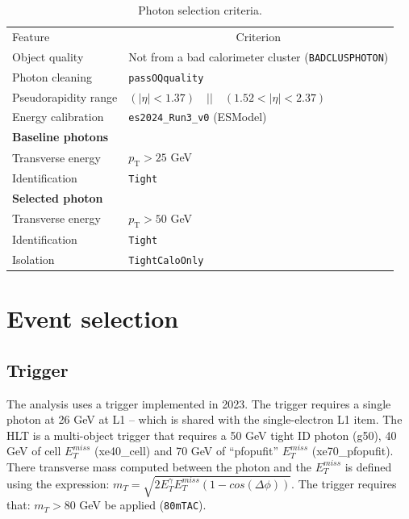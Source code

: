 \begin{table}[ht]
  \caption{Photon selection criteria.}%
  \label{tab:object:photon} 
  \centering
  \begin{tabular}{ll}
    \toprule
    Feature & \multicolumn{1}{c}{Criterion} \\
    Object quality & Not from a bad calorimeter cluster (\texttt{BADCLUSPHOTON})\\ %
    Photon cleaning & \texttt{passOQquality} \\
    Pseudorapidity range & $(|\eta| < 1.37) \quad || \quad (1.52 < |\eta| < 2.37)$ \\
    Energy calibration & \texttt{es2024\_Run3\_v0} (ESModel)\\
    \midrule\midrule
    \textbf{Baseline photons} &\\ 
    \midrule
    Transverse energy & $p_{\mathrm{T}}>25$ GeV \\
    Identification & \texttt{Tight} \\
    \midrule
    \textbf{Selected photon} &\\ 
    \midrule
    Transverse energy & $p_{\mathrm{T}}>50$ GeV \\
    Identification & \texttt{Tight} \\
    Isolation &  \texttt{TightCaloOnly} \\
    \bottomrule
  \end{tabular}
\end{table}




\FloatBarrier
\section{Event selection}
\subsection{Trigger}
The analysis uses a trigger implemented in 2023. 
The trigger requires a single photon at 26 GeV at L1 -- which is shared with the single-electron L1 item. The HLT is a multi-object trigger that requires a 50 GeV tight ID photon (g50), 40 GeV of cell $E_{T}^{miss}$ (xe40\_cell) and 70 GeV of ``pfopufit'' $E_{T}^{miss}$ (xe70\_pfopufit). There transverse mass computed between the photon and the $E_{T}^{miss}$ is defined using the expression: $m_T = \sqrt{2 E_{T}^{\gamma}E_{T}^{miss} (1-cos(\Delta \phi))}$. The trigger requires that: $m_T > 80$ GeV be applied (\texttt{80mTAC}).\\

